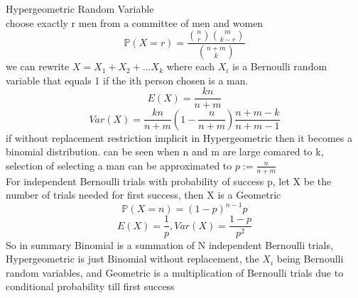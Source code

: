 \documentclass{article}
\begin{document}
Hypergeometric Random Variable \\
choose exactly r men from a committee of men and women
$$
\mathbb{P}(X=r)=\frac{{n \choose r}{m \choose k-r}}{{n+m \choose k}}
$$
we can rewrite  $X=X_1+X_2+...X_k$
where each $X_i$ is a Bernoulli random variable that equals 1 if the ith person chosen is a man.
$$
E(X)=\frac{kn}{n+m}
$$
$$
Var(X)=\frac{kn}{n+m}(1-\frac{n}{n+m})\frac{n+m-k}{n+m-1}
$$
if without replacement restriction implicit in Hypergeometric then it becomes a binomial distribution. can be seen when n and m are large comared to k, selection of selecting a man can be approximated to $p:=\frac{n}{n+m}$\\
For independent Bernoulli trials with probability of success p, let X be the number of trials needed for first success, then X is a Geometric
$$
\mathbb P(X=n)=(1-p)^{n-1}p
$$
$$
E(X)=\frac{1}{p}, Var(X)=\frac{1-p}{p^2}
$$
So in summary Binomial is a summation of N independent Bernoulli trials, Hypergeometric is just Binomial without replacement, the $X_i$ being Bernoulli random variables, and Geometric is a multiplication of Bernoulli trials due to conditional probability till first success
\end{document}
